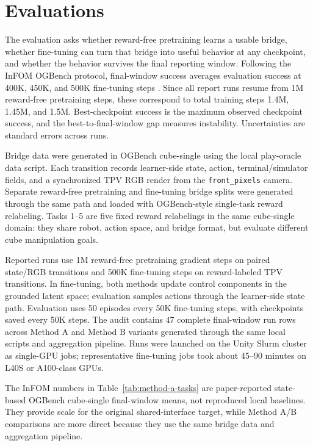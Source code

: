 \documentclass{article}
\begin{document}
\section{Evaluations}
\label{sec:evaluations}

The evaluation asks whether reward-free pretraining learns a usable bridge, whether fine-tuning can turn that bridge into useful behavior at any checkpoint, and whether the behavior survives the final reporting window. Following the InFOM OGBench protocol, final-window success averages evaluation success at 400K, 450K, and 500K fine-tuning steps \citep{Zheng2025InFOM}. Since all report runs resume from 1M reward-free pretraining steps, these correspond to total training steps 1.4M, 1.45M, and 1.5M. Best-checkpoint success is the maximum observed checkpoint success, and the best-to-final-window gap measures instability. Uncertainties are standard errors across runs.

Bridge data were generated in OGBench cube-single using the local play-oracle data script. Each transition records learner-side state, action, terminal/simulator fields, and a synchronized TPV RGB render from the \texttt{front\_pixels} camera. Separate reward-free pretraining and fine-tuning bridge splits were generated through the same path and loaded with OGBench-style single-task reward relabeling. Tasks 1--5 are five fixed reward relabelings in the same cube-single domain: they share robot, action space, and bridge format, but evaluate different cube manipulation goals.

Reported runs use 1M reward-free pretraining gradient steps on paired state/RGB transitions and 500K fine-tuning steps on reward-labeled TPV transitions. In fine-tuning, both methods update control components in the grounded latent space; evaluation samples actions through the learner-side state path. Evaluation uses 50 episodes every 50K fine-tuning steps, with checkpoints saved every 50K steps. The audit contains 47 complete final-window run rows across Method A and Method B variants generated through the same local scripts and aggregation pipeline. Runs were launched on the Unity Slurm cluster as single-GPU jobs; representative fine-tuning jobs took about 45--90 minutes on L40S or A100-class GPUs.

The InFOM numbers in Table~\ref{tab:method-a-tasks} are paper-reported state-based OGBench cube-single final-window means, not reproduced local baselines. They provide scale for the original shared-interface target, while Method A/B comparisons are more direct because they use the same bridge data and aggregation pipeline.
\end{document}
